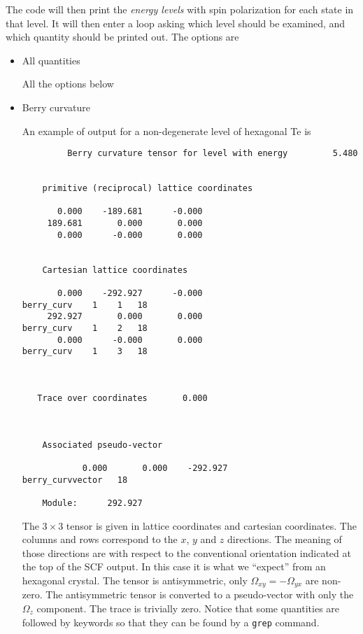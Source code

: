 \documentclass[11pt]{article}
\begin{document}
   The code will then print the {\it energy levels} with spin polarization for each
   state in that level.  It will then enter a loop asking which level
   should be examined, and which quantity should be printed out.
   The options are
   \begin{itemize}

      \item{All quantities}

      All the options below

      \item{Berry curvature}

      An example of output for a non-degenerate level of hexagonal Te is
      \begin{verbatim}
         Berry curvature tensor for level with energy         5.480


    primitive (reciprocal) lattice coordinates

       0.000    -189.681      -0.000
     189.681       0.000       0.000
       0.000      -0.000       0.000


    Cartesian lattice coordinates

       0.000    -292.927      -0.000                        berry_curv    1    1   18
     292.927       0.000       0.000                        berry_curv    1    2   18
       0.000      -0.000       0.000                        berry_curv    1    3   18



   Trace over coordinates       0.000



    Associated pseudo-vector

            0.000       0.000    -292.927                    berry_curvvector   18

    Module:      292.927

      \end{verbatim}
      The $3\times3$ tensor is given in lattice coordinates and cartesian coordinates.
      The columns and rows correspond to the $x$, $y$ and $z$ directions.
      The meaning of those directions are with respect to the conventional orientation
      indicated at the top of the SCF output.  In this case it is what we ``expect'' from
      an hexagonal crystal.  The tensor is antisymmetric, only $\Omega_{xy}=-\Omega_{yx}$
      are non-zero.  The antisymmetric tensor is converted to a pseudo-vector with only
      the $\Omega_z$ component.  The trace is trivially zero.
      Notice that some quantities are followed by keywords so that they can be found by a
      \texttt{grep} command.


\end{itemize}
\end{document}

